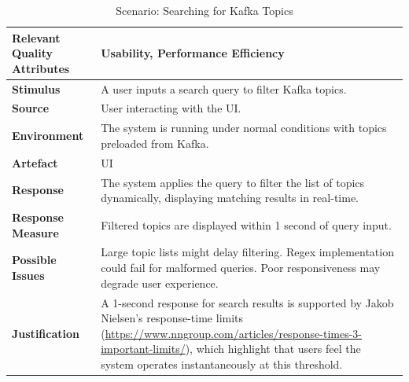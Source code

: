 \documentclass[10pt , a4paper]{report}
\begin{document}
\begin{small}
\begin{table}[h!tbp]
\centering
\renewcommand{\arraystretch}{1.3} %
\begin{tabular}{|l|p{9cm}|}
\hline
\textbf{Relevant Quality Attributes} & Usability, Performance Efficiency \\ \hline
\textbf{Stimulus} & A user inputs a search query to filter Kafka topics. \\ \hline
\textbf{Source} & User interacting with the UI. \\ \hline
\textbf{Environment} & The system is running under normal conditions with topics preloaded from Kafka. \\ \hline
\textbf{Artefact} & UI \\ \hline
\textbf{Response} & The system applies the query to filter the list of topics dynamically, displaying matching results in real-time. \\ \hline
\textbf{Response Measure} & Filtered topics are displayed within 1 second of query input. \\ \hline
\textbf{Possible Issues} & Large topic lists might delay filtering. Regex implementation could fail for malformed queries. Poor responsiveness may degrade user experience. \\ \hline
\textbf{Justification} & A 1-second response for search results is supported by Jakob Nielsen's response-time limits (\url{https://www.nngroup.com/articles/response-times-3-important-limits/}), which highlight that users feel the system operates instantaneously at this threshold. \\ \hline
\end{tabular}
\caption{Scenario: Searching for Kafka Topics}
\end{table}


\end{small}
\end{document}
